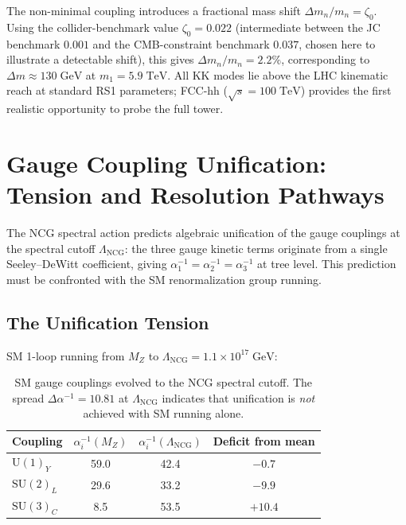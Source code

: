 The non-minimal coupling introduces a fractional mass shift $\Delta m_n/m_n = \zeta_0$.  Using the collider-benchmark value $\zeta_0 = 0.022$ (intermediate between the JC benchmark $0.001$ and the CMB-constraint benchmark $0.037$, chosen here to illustrate a detectable shift), this gives $\Delta m_n/m_n = 2.2\%$, corresponding to $\Delta m \approx 130\;\mathrm{GeV}$ at $m_1 = 5.9\;\mathrm{TeV}$.  All KK modes lie above the LHC kinematic reach at standard RS1 parameters; FCC-hh ($\sqrt{s} = 100\;\mathrm{TeV}$) provides the first realistic opportunity to probe the full tower.


\section{Gauge Coupling Unification: Tension and Resolution Pathways}
\label{sec:4-gauge-unification}

The NCG spectral action predicts algebraic unification of the gauge couplings at the spectral cutoff $\Lambda_{\mathrm{NCG}}$: the three gauge kinetic terms originate from a single Seeley--DeWitt coefficient, giving $\alpha_1^{-1} = \alpha_2^{-1} = \alpha_3^{-1}$ at tree level.  This prediction must be confronted with the SM renormalization group running.

\subsection{The Unification Tension}
\label{sec:4-unification-tension}

SM 1-loop running from $M_Z$ to $\Lambda_{\mathrm{NCG}} = 1.1 \times 10^{17}\;\mathrm{GeV}$:

\begin{table}[htbp]
\centering
\caption{SM gauge couplings evolved to the NCG spectral cutoff.  The spread $\Delta \alpha^{-1} = 10.81$ at $\Lambda_{\mathrm{NCG}}$ indicates that unification is \emph{not} achieved with SM running alone.}
\label{tab:4-gauge-unification}
\small
\begin{tabular}{@{}lccc@{}}
\toprule
Coupling & $\alpha_i^{-1}(M_Z)$ & $\alpha_i^{-1}(\Lambda_{\mathrm{NCG}})$ & Deficit from mean \\
\midrule
$\mathrm{U}(1)_Y$ & 59.0 & 42.4 & $-0.7$ \\
$\mathrm{SU}(2)_L$ & 29.6 & 33.2 & $-9.9$ \\
$\mathrm{SU}(3)_C$ & 8.5 & 53.5 & $+10.4$ \\
\bottomrule
\end{tabular}
\end{table}

